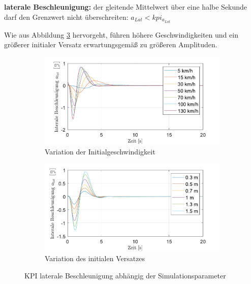 \medskip\noindent\textbf{laterale Beschleunigung:} der gleitende Mittelwert über eine halbe Sekunde darf den Grenzwert nicht überschreiten: $a_{Lat} < kpi_{a_{Lat}}$

\noindent Wie aus Abbildung \ref{fig:Straight_Offset_a-Lat} hervorgeht, führen höhere Geschwindigkeiten und ein größerer initialer Versatz erwartungsgemäß zu größeren Amplituden.
\begin{figure}[ht]
    \centering
    \begin{subfigure}[b]{.49\textwidth}
        \centering
        \includegraphics[width=\textwidth]{figures/3_Implementierung/Straight_Offset/varVelo_1mOffset_a-Lat.pdf}
        \caption{Variation der Initialgeschwindigkeit}
        \label{fig:varVelo_1mOffset_a-Lat}
    \end{subfigure}
    \hfill
    \begin{subfigure}[b]{.49\textwidth}
        \centering
        \includegraphics[width=\textwidth]{figures/3_Implementierung/Straight_Offset/varOffset_50kmh_a-Lat.pdf}
        \caption{Variation des initialen Versatzes}
        \label{fig:varOffset_50kmh_a-Lat}
    \end{subfigure}
    \caption{KPI laterale Beschleunigung abhängig der Simulationsparameter}
    \label{fig:Straight_Offset_a-Lat}
\end{figure}

